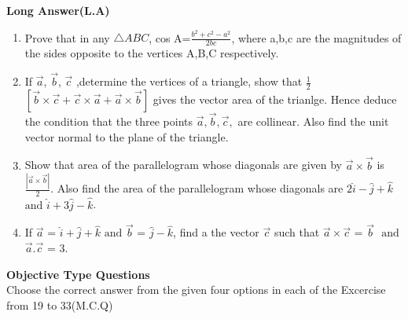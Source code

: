 \documentclass{article}
\providecommand{\abs}[1]{\left\vert#1\right\vert}
\begin{document}
\textbf{Long Answer(L.A)}
\begin{enumerate}[resume]
\item Prove that in any $\triangle{ABC}$, cos A=$\frac{b^2+c^2-a^2}{2bc}$, where a,b,c are the magnitudes of the sides opposite to the vertices A,B,C respectively.


\item If $\vec{a}$, $\vec{b}$, $\vec{c}$ ,determine the vertices of a triangle, show that $\frac{1}{2}$ $\left[\vec{b} \times\vec{c}+\vec{c} \times\vec{a}+\vec{a}\times\vec{b} \right]$ gives the vector area of the trianlge. Hence deduce the condition that the three points $\vec{a},\vec{b},\vec{c},$ are collinear. Also find the unit vector normal to the plane of the triangle.

\item Show that area of the parallelogram whose diagonals are given by $\vec{a}\times\vec{b}$ is $\frac{\abs{\vec{a}\times\vec{b}}}{2}$. Also find the area of the parallelogram whose diagonals are $2\hat{i}-\hat{j}+\hat{k}$ $\text{and}$ $\hat{i}+3\hat{j}-\hat{k}$.


\item If $\vec{a}$ = $\hat{i}+\hat{j}+\hat{k}$ $\text{and}$ $\vec{b}$ = $\hat{j}-\hat{k}$, find a the vector $\vec{c}$ such that $\vec{a}\times\vec{c}$ = $\vec{b}$ $\text{ and}$ $\vec{a}$.$\vec{c}$ = 3.

\end{enumerate}
\textbf{Objective Type Questions}
\\
Choose the correct answer from the given four options in each of the Excercise from 19 to 33(M.C.Q)
\end{document}
